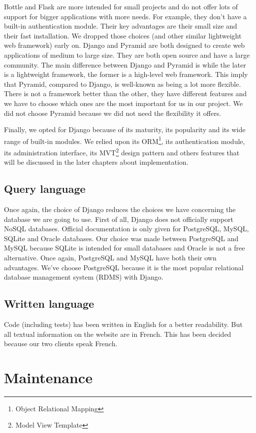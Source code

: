 Bottle and Flask are more intended for small projects and do not offer lots of support for bigger applications with more needs. For example, they don't have a built-in authentication module. Their key advantages are their small size and their fast installation. We dropped those choices (and other similar lightweight web framework) early on.
Django and Pyramid are both designed to create web applications of medium to large size.  They are both open source and have a large community.
The main difference between Django and Pyramid is while the later is a lightweight framework, the former is a high-level web framework. This imply that Pyramid, compared to Django, is well-known as being a lot more flexible.
There is not a framework better than the other, they have different features and we have to choose which ones are the most important for us in our project.
We did not choose Pyramid because we did not need the flexibility it offers.

Finally, we opted for Django because of its maturity, its popularity and its wide range of built-in modules. We relied upon its ORM\footnote{Object Relational Mapping}, its authentication module, its administration interface, its MVT\footnote{Model View Template} design pattern and others features that will be discussed in the later chapters about implementation.


\subsection{Query language}
Once again, the choice of Django reduces the choices we have concerning the database we are going to use. First of all, Django does not officially support NoSQL databases.
Official documentation is only given for PostgreSQL, MySQL, SQLite and Oracle databases.
Our choice was made between PostgreSQL and MySQL because SQLite is intended for small databases and Oracle is not a free alternative.
Once again, PostgreSQL and MySQL have both their own advantages. We've choose PostgreSQL because it is the most popular relational database management system (RDMS) with Django.

\subsection{Written language}
Code (including tests) has been written in English for a better readability. But all textual information on the website are in French. This has been decided because our two clients speak French.

\section{Maintenance}



